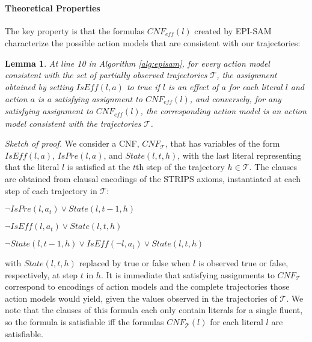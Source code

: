 \documentclass[letterpaper]{article} %
\newtheorem{lemma}{Lemma}
\newcommand{\tuple}[1]{\ensuremath{\left \langle #1 \right \rangle }}
\newcommand{\eff}{\textit{eff}}
\newcommand{\iseff}{\textit{IsEff}}
\newcommand{\ispre}{\textit{IsPre}}
\begin{document}



\paragraph{Theoretical Properties}
The key property is that the formulas $CNF_{\eff}(l)$ created by EPI-SAM characterize the possible action models that are consistent with our trajectories:
\begin{lemma}\label{lem:cnf-char}
At line 10 in Algorithm \ref{alg:episam}, for every action model consistent with the set of partially observed trajectories $\mathcal{T}$, the assignment obtained by setting $\iseff(l,a)$ to true if $l$ is an effect of $a$ for each literal $l$ and action $a$ is a satisfying assignment to $CNF_{\eff}(l)$, and conversely, for any satisfying assignment to $CNF_{\eff}(l)$, the corresponding action model is an action model consistent with the trajectories $\mathcal{T}$.
\end{lemma}
\noindent
{\em Sketch of proof.}
We consider a CNF, $CNF_{\mathcal{T}}$, that has variables of the form $\iseff(l,a)$, $\ispre(l,a)$, and $State(l,t,h)$, with the last literal representing that the literal $l$ is satisfied at the $t$th step of the trajectory $h\in\mathcal{T}$. The clauses are obtained from clausal encodings of the STRIPS axioms, instantiated at each step of each trajectory in $\mathcal{T}$:
\begin{compactenum}
\item $\neg \ispre(l,a_t)\vee State(l,t-1,h)$
\item $\neg \iseff(l,a_t)\vee State(l,t,h)$
\item $\neg State(l,t-1,h)\vee \iseff(\neg l,a_t)\vee State(l,t,h)$
\end{compactenum}
with $State(l,t,h)$ replaced by true or false when $l$ is observed true or false, respectively, at step $t$ in $h$. It is immediate that satisfying assignments to $CNF_{\mathcal{T}}$ correspond to encodings of action models and the complete trajectories those action models would yield, given the values observed in the trajectories of $\mathcal{T}$. We note that the clauses of this formula each only contain literals for a single fluent, so the formula is satisfiable iff the formulas $CNF_{\mathcal{T}}(l)$ for each literal $l$ are satisfiable.
\end{document}
